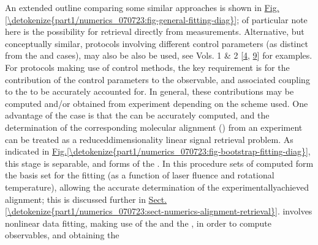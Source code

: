 \documentclass[letterpaper,table,10pt,english]{jupyterBook}
\begin{document}
\sphinxAtStartPar
An extended outline comparing some similar approaches is shown in \hyperref[\detokenize{part1/numerics_070723:fig-general-fitting-diag}]{Fig.\@ \ref{\detokenize{part1/numerics_070723:fig-general-fitting-diag}}}; of particular note here is the possibility for retrieval directly from {\hyperref[\detokenize{backmatter/glossary:term-MF}]{}} measurements. Alternative, but conceptually similar, protocols involving different control parameters (as distinct from the {\hyperref[\detokenize{backmatter/glossary:term-RWP}]{}} and {\hyperref[\detokenize{backmatter/glossary:term-MF}]{}} cases), may also be also be used, see  Vols. 1 \& 2 {[}\hyperlink{cite.backmatter/bibliography:id676}{4}, \hyperlink{cite.backmatter/bibliography:id677}{9}{]} for examples. For protocols making use of control methods, the key requirement is for the contribution of the control parameters to the observable, and associated coupling to the {\hyperref[\detokenize{backmatter/glossary:term-channel-functions}]{}} to be accurately accounted for. In general, these contributions may be computed and/or obtained from experiment depending on the scheme used. One advantage of the {\hyperref[\detokenize{backmatter/glossary:term-RWP}]{}} case is that the {\hyperref[\detokenize{backmatter/glossary:term-RWP}]{}} can be accurately computed, and the determination of the corresponding molecular alignment ({\hyperref[\detokenize{backmatter/glossary:term-ADMs}]{}}) from an experiment can be treated as a reduced\sphinxhyphen{}dimensionality linear signal retrieval problem. As indicated in \hyperref[\detokenize{part1/numerics_070723:fig-bootstrap-fitting-diag}]{Fig.\@ \ref{\detokenize{part1/numerics_070723:fig-bootstrap-fitting-diag}}}, this stage is separable, and forms  of the {\hyperref[\detokenize{backmatter/glossary:term-bootstrap-retrieval-protocol}]{}}. In this procedure sets of computed {\hyperref[\detokenize{backmatter/glossary:term-ADMs}]{}} form the basis set for the fitting (as a function of laser fluence and rotational temperature), allowing the accurate determination of the experimentally\sphinxhyphen{}achieved alignment; this is discussed further in \hyperref[\detokenize{part1/numerics_070723:sect-numerics-alignment-retrieval}]{Sect.\@ \ref{\detokenize{part1/numerics_070723:sect-numerics-alignment-retrieval}}}.  involves non\sphinxhyphen{}linear data fitting, making use of the {\hyperref[\detokenize{backmatter/glossary:term-ADMs}]{}} and the {\hyperref[\detokenize{backmatter/glossary:term-channel-functions}]{}}, in order to compute observables, and obtaining the 
\end{document}
